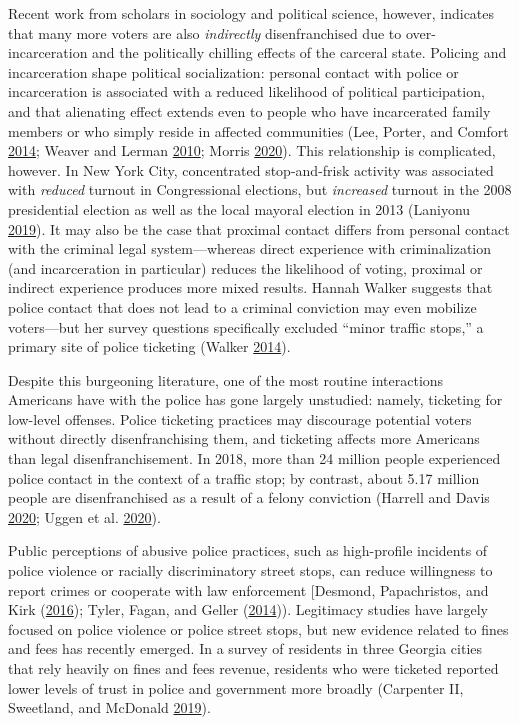 \documentclass[
  12pt,
]{article}
\begin{document}
Recent work from scholars in sociology and political science, however, indicates that many more voters are also \emph{indirectly} disenfranchised due to over-incarceration and the politically chilling effects of the carceral state. Policing and incarceration shape political socialization: personal contact with police or incarceration is associated with a reduced likelihood of political participation, and that alienating effect extends even to people who have incarcerated family members or who simply reside in affected communities (Lee, Porter, and Comfort \protect\hyperlink{ref-Lee2014}{2014}; Weaver and Lerman \protect\hyperlink{ref-Weaver2010}{2010}; Morris \protect\hyperlink{ref-Morris2020}{2020}). This relationship is complicated, however. In New York City, concentrated stop-and-frisk activity was associated with \emph{reduced} turnout in Congressional elections, but \emph{increased} turnout in the 2008 presidential election as well as the local mayoral election in 2013 (Laniyonu \protect\hyperlink{ref-Laniyonu2019}{2019}). It may also be the case that proximal contact differs from personal contact with the criminal legal system---whereas direct experience with criminalization (and incarceration in particular) reduces the likelihood of voting, proximal or indirect experience produces more mixed results. Hannah Walker suggests that police contact that does not lead to a criminal conviction may even mobilize voters---but her survey questions specifically excluded ``minor traffic stops,'' a primary site of police ticketing (Walker \protect\hyperlink{ref-Walker2014}{2014}).

Despite this burgeoning literature, one of the most routine interactions Americans have with the police has gone largely unstudied: namely, ticketing for low-level offenses. Police ticketing practices may discourage potential voters without directly disenfranchising them, and ticketing affects more Americans than legal disenfranchisement. In 2018, more than 24 million people experienced police contact in the context of a traffic stop; by contrast, about 5.17 million people are disenfranchised as a result of a felony conviction (Harrell and Davis \protect\hyperlink{ref-Harrell2020}{2020}; Uggen et al. \protect\hyperlink{ref-Uggen2020}{2020}).

Public perceptions of abusive police practices, such as high-profile incidents of police violence or racially discriminatory street stops, can reduce willingness to report crimes or cooperate with law enforcement {[}Desmond, Papachristos, and Kirk (\protect\hyperlink{ref-Desmond2016}{2016}); Tyler, Fagan, and Geller (\protect\hyperlink{ref-Tyler2014}{2014})). Legitimacy studies have largely focused on police violence or police street stops, but new evidence related to fines and fees has recently emerged.
In a survey of residents in three Georgia cities that rely heavily on fines and fees revenue, residents who were ticketed reported lower levels of trust in police and government more broadly (Carpenter II, Sweetland, and McDonald \protect\hyperlink{ref-CarpenterII2019}{2019}).
\end{document}
